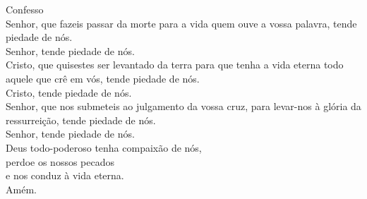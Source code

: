 \textcolor{VioletRed1}{Confesso}
\vspace{0.2cm} \\
\VbarRed{} Senhor, que fazeis passar da morte para a vida quem ouve a vossa palavra, tende piedade de nós.\\
\RbarRed{} Senhor, tende piedade de nós.
\vspace{0.1cm} \\
\VbarRed{} Cristo, que quisestes ser levantado da terra para que tenha a vida eterna todo aquele que crê em vós, tende piedade de nós.\\
\RbarRed{} Cristo, tende piedade de nós.
\vspace{0.1cm} \\
\VbarRed{} Senhor, que nos submeteis ao julgamento da vossa cruz, para levar-nos à glória da ressurreição, tende piedade de nós.\\
\RbarRed{} Senhor, tende piedade de nós.
\vspace{0.1cm} \\
Deus todo-poderoso tenha compaixão de nós, \\
perdoe os nossos pecados \\
e nos conduz à vida eterna. \\
\RbarRed{} Amém.
\vspace{0.2cm} \\
